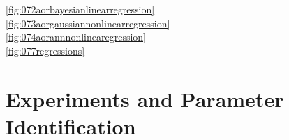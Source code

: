 	  \ref{fig:072aorbayesianlinearregression}\\

	  \ref{fig:073aorgaussiannonlinearregression}\\

	  \ref{fig:074aorannnonlinearegression}\\
  \ref{fig:077regressions}\\


\section{Experiments and Parameter Identification}
\label{sec:experimentsparameteridentification}




